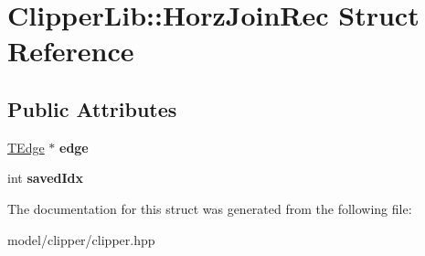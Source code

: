 \hypertarget{structClipperLib_1_1HorzJoinRec}{\section{Clipper\-Lib\-:\-:Horz\-Join\-Rec Struct Reference}
\label{structClipperLib_1_1HorzJoinRec}
}
\subsection*{Public Attributes}
\begin{DoxyCompactItemize}
\item 
\hypertarget{structClipperLib_1_1HorzJoinRec_a610c6cf1e5edfc418da0965c3f68a8b8}{\hyperlink{structClipperLib_1_1TEdge}{T\-Edge} $\ast$ {\bfseries edge}}\label{structClipperLib_1_1HorzJoinRec_a610c6cf1e5edfc418da0965c3f68a8b8}

\item 
\hypertarget{structClipperLib_1_1HorzJoinRec_a58dada80e24143e14c71458340099b14}{int {\bfseries saved\-Idx}}\label{structClipperLib_1_1HorzJoinRec_a58dada80e24143e14c71458340099b14}

\end{DoxyCompactItemize}


The documentation for this struct was generated from the following file\-:\begin{DoxyCompactItemize}
\item 
model/clipper/clipper.\-hpp\end{DoxyCompactItemize}
